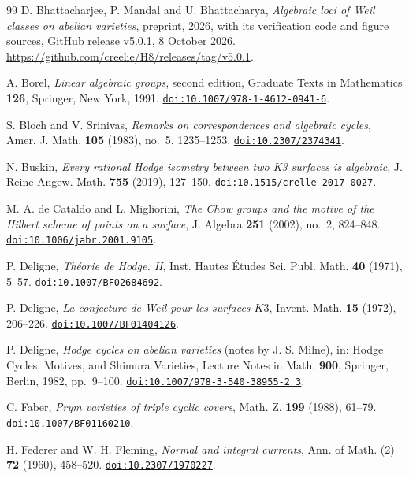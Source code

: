 \documentclass[11pt,reqno]{amsart}
\numberwithin{equation}{section}
\theoremstyle{plain}
\theoremstyle{definition}
\begin{document}
\begin{thebibliography}{99}
D. Bhattacharjee, P. Mandal and U. Bhattacharya,
\emph{Algebraic loci of Weil classes on abelian varieties},
preprint, 2026, with its verification code and figure sources, GitHub release v5.0.1, 8 October 2026.
\url{https://github.com/creelie/H8/releases/tag/v5.0.1}.

A. Borel,
\emph{Linear algebraic groups}, second edition,
Graduate Texts in Mathematics \textbf{126}, Springer, New York, 1991.
\href{https://doi.org/10.1007/978-1-4612-0941-6}{\nolinkurl{doi:10.1007/978-1-4612-0941-6}}.

S. Bloch and V. Srinivas,
\emph{Remarks on correspondences and algebraic cycles},
Amer. J. Math. \textbf{105} (1983), no.~5, 1235--1253.
\href{https://doi.org/10.2307/2374341}{\nolinkurl{doi:10.2307/2374341}}.

N. Buskin,
\emph{Every rational Hodge isometry between two K3 surfaces is algebraic},
J. Reine Angew. Math. \textbf{755} (2019), 127--150.
\href{https://doi.org/10.1515/crelle-2017-0027}{\nolinkurl{doi:10.1515/crelle-2017-0027}}.

M. A. de Cataldo and L. Migliorini,
\emph{The Chow groups and the motive of the Hilbert scheme of points on a
surface},
J. Algebra \textbf{251} (2002), no.~2, 824--848.
\href{https://doi.org/10.1006/jabr.2001.9105}{\nolinkurl{doi:10.1006/jabr.2001.9105}}.

P. Deligne,
\emph{Th\'eorie de Hodge. II},
Inst. Hautes \'Etudes Sci. Publ. Math. \textbf{40} (1971), 5--57.
\href{https://doi.org/10.1007/BF02684692}{\nolinkurl{doi:10.1007/BF02684692}}.

P. Deligne,
\emph{La conjecture de Weil pour les surfaces $K3$},
Invent. Math. \textbf{15} (1972), 206--226.
\href{https://doi.org/10.1007/BF01404126}{\nolinkurl{doi:10.1007/BF01404126}}.

P. Deligne,
\emph{Hodge cycles on abelian varieties} (notes by J. S. Milne),
in: Hodge Cycles, Motives, and Shimura Varieties,
Lecture Notes in Math. \textbf{900}, Springer, Berlin, 1982, pp.~9--100.
\href{https://doi.org/10.1007/978-3-540-38955-2_3}{\nolinkurl{doi:10.1007/978-3-540-38955-2_3}}.

C. Faber,
\emph{Prym varieties of triple cyclic covers},
Math. Z. \textbf{199} (1988), 61--79.
\href{https://doi.org/10.1007/BF01160210}{\nolinkurl{doi:10.1007/BF01160210}}.

H. Federer and W. H. Fleming,
\emph{Normal and integral currents},
Ann. of Math. (2) \textbf{72} (1960), 458--520.
\href{https://doi.org/10.2307/1970227}{\nolinkurl{doi:10.2307/1970227}}.


\end{thebibliography}
\end{document}
